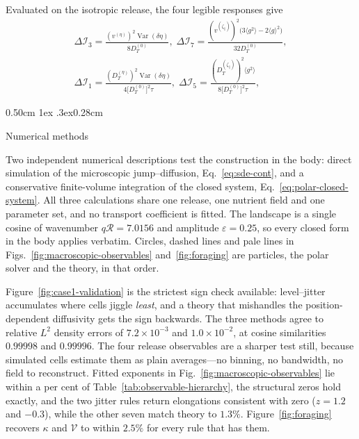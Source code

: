 \documentclass[
  reprint,
  superscriptaddress,
  amsmath,
  amssymb,
  aps,
  pre,
  nofootinbib,
  floatfix
]{revtex4-2}
\makeatletter
\newcommand{\zp}{\zeta_\parallel}
\newcommand{\Irate}{\mathcal I}
\DeclareMathOperator{\Var}{Var}
\def\section{\@startsection{section}{1}{\z@}%
  {0.50cm \@plus1ex \@minus.3ex}{0.28cm}%
  {\normalfont\small\bfseries\raggedright}}%
\makeatother
\begin{document}
Evaluated on the isotropic release, the four legible responses give
\begin{equation}
\begin{gathered}
 \Delta\Irate_3=\frac{(v^{(\eta)})^{2}\Var(\delta\eta)}{8D_T^{(0)}},
 \;
 \Delta\Irate_7=\frac{(v^{(\zp)})^{2}
 \bigl(3\langle g^{2}\rangle-2\langle g\rangle^{2}\bigr)}{32D_T^{(0)}},\\
 \Delta\Irate_1=\frac{(D_T^{(\eta)})^{2}\Var(\delta\eta)}
 {4\bigl[D_T^{(0)}\bigr]^{2}\tau},
 \;
 \Delta\Irate_5=\frac{(D_T^{(\zp)})^{2}\langle g^{2}\rangle}
 {8\bigl[D_T^{(0)}\bigr]^{2}\tau},
\end{gathered}
 \label{eq:information-cases}
\end{equation}

\section{Numerical methods}
\label{app:numerics}
\label{sec:model-comparison}

Two independent numerical descriptions test the construction in the body:
direct simulation of the microscopic jump--diffusion,
Eq.~\eqref{eq:sde-cont}, and a conservative finite-volume integration of the
closed system, Eq.~\eqref{eq:polar-closed-system}.  All three calculations
share one release, one nutrient field and one parameter set, and no transport
coefficient is fitted.  The landscape is a single cosine of wavenumber
$q\mathcal R=7.0156$ and amplitude $\varepsilon=0.25$, so every closed form
in the body applies verbatim.  Circles, dashed lines and pale lines in
Figs.~\ref{fig:macroscopic-observables} and~\ref{fig:foraging} are particles,
the polar solver and the theory, in that order.

Figure~\ref{fig:case1-validation} is the strictest sign check available:
level--jitter accumulates where cells jiggle \emph{least}, and a theory that
mishandles the position-dependent diffusivity gets the sign backwards.  The
three methods agree to relative $L^{2}$ density errors of $7.2\times10^{-3}$
and $1.0\times10^{-2}$, at cosine similarities $0.99998$ and $0.99996$.  The
four release observables are a sharper test still, because simulated cells
estimate them as plain averages---no binning, no bandwidth, no field to
reconstruct.  Fitted exponents in
Fig.~\ref{fig:macroscopic-observables} lie within a per cent of
Table~\ref{tab:observable-hierarchy}, the structural zeros hold exactly, and
the two jitter rules return elongations consistent with zero ($z=1.2$ and
$-0.3$), while the other seven match theory to $1.3\%$.
Figure~\ref{fig:foraging} recovers $\kappa$ and $\mathcal V$ to within $2.5\%$
for every rule that has them.
\end{document}
